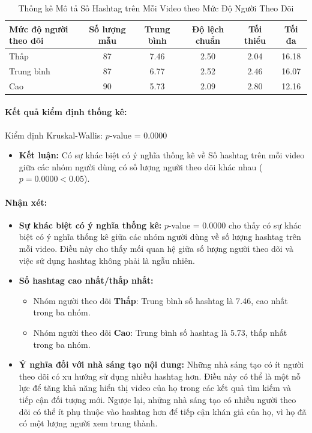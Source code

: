 \begin{table}[h!]
    \centering
    \begin{tabular}{lccccc}
        \toprule
        Mức độ người theo dõi & Số lượng mẫu & Trung bình & Độ lệch chuẩn & Tối thiểu & Tối đa \\
        \midrule
        Thấp & 87 & 7.46 & 2.50 & 2.04 & 16.18 \\
        Trung bình & 87 & 6.77 & 2.52 & 2.46 & 16.07 \\
        Cao & 90 & 5.73 & 2.09 & 2.80 & 12.16 \\
        \bottomrule
    \end{tabular}
    \caption{Thống kê Mô tả Số Hashtag trên Mỗi Video theo Mức Độ Người Theo Dõi}
    \label{tab:so_hashtag_thong_ke}
\end{table}

\paragraph{Kết quả kiểm định thống kê:}
Kiểm định Kruskal-Wallis: $p$-value = 0.0000
\begin{itemize}
    \item \textbf{Kết luận:} Có sự khác biệt có ý nghĩa thống kê về Số hashtag trên mỗi video giữa các nhóm người dùng có số lượng người theo dõi khác nhau ($p = 0.0000 < 0.05$).
\end{itemize}

\paragraph{Nhận xét:}
\begin{itemize}
    \item \textbf{Sự khác biệt có ý nghĩa thống kê:} $p$-value = 0.0000 cho thấy có sự khác biệt có ý nghĩa thống kê giữa các nhóm người dùng về số lượng hashtag trên mỗi video. Điều này cho thấy mối quan hệ giữa số lượng người theo dõi và việc sử dụng hashtag không phải là ngẫu nhiên.

    \item \textbf{Số hashtag cao nhất/thấp nhất:}
    \begin{itemize}
        \item Nhóm người theo dõi \textbf{Thấp}: Trung bình số hashtag là 7.46, cao nhất trong ba nhóm.
        \item Nhóm người theo dõi \textbf{Cao}: Trung bình số hashtag là 5.73, thấp nhất trong ba nhóm.
    \end{itemize}

    \item \textbf{Ý nghĩa đối với nhà sáng tạo nội dung:} Những nhà sáng tạo có ít người theo dõi có xu hướng sử dụng nhiều hashtag hơn. Điều này có thể là một nỗ lực để tăng khả năng hiển thị video của họ trong các kết quả tìm kiếm và tiếp cận đối tượng mới. Ngược lại, những nhà sáng tạo có nhiều người theo dõi có thể ít phụ thuộc vào hashtag hơn để tiếp cận khán giả của họ, vì họ đã có một lượng người xem trung thành.
\end{itemize}

